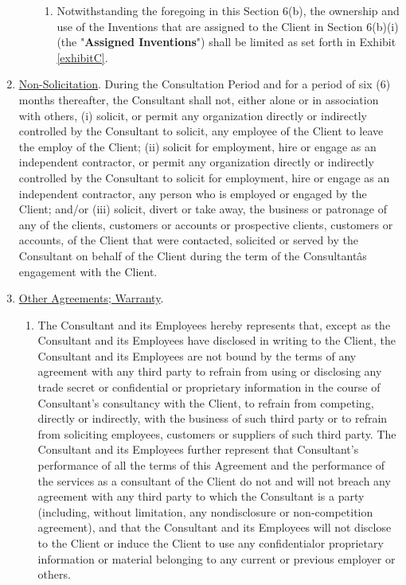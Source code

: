 \documentclass[12pt]{article}
\begin{document}
\begin{enumerate}
\begin{enumerate}
\begin{enumerate}[(1)]
            \item Notwithstanding the foregoing in this Section 6(b), the ownership and use of the Inventions that are assigned to the Client in Section 6(b)(i) (the "{\bf Assigned Inventions}") shall be limited as set forth in Exhibit \ref{exhibitC}.
        \end{enumerate}
    \end{enumerate}
    \item \underline{Non-Solicitation}.
    During the Consultation Period and for a period of six (6) months thereafter, the Consultant shall not, either alone or in association with others, (i) solicit, or permit any organization directly or indirectly controlled by the Consultant to solicit, any employee of the Client to leave the employ of the Client; (ii) solicit for employment, hire or engage as an independent contractor, or permit any organization directly or indirectly controlled by the Consultant to solicit for employment, hire or engage as an independent contractor, any person who is employed or engaged by the Client; and/or (iii) solicit, divert or take away, the business or patronage of any of the clients, customers or accounts or prospective clients, customers or accounts, of the Client that were contacted, solicited or served by the Consultant on behalf of the Client during the term of the Consultantâs engagement with the Client.
    \item \underline{Other Agreements; Warranty}.
    \begin{enumerate}
        \item The Consultant and its Employees hereby
        represents
        that, except as the
        Consultant and its Employees have
        disclosed in writing to the Client, the
        Consultant and its Employees are
        not bound by the terms of any agreement with any third party to refrain from using or disclosing any trade secret or confidential or proprietary information in the course of Consultant's consultancy with the Client, to refrain from competing, directly or indirectly, with the business of such third party or to refrain from soliciting employees, customers or suppliers of such third party.  The
        Consultant and its Employees further represent
        that Consultant's performance of all the terms of this Agreement and the performance of the services as a consultant of the Client do not and will not breach any agreement with any third party to which the Consultant is a party (including, without limitation, any nondisclosure or non-competition agreement), and that the Consultant and its Employees will not disclose to the Client or induce the Client to use any confidentialor proprietary information or material belonging to any current or previous employer or others.

\end{enumerate}
\end{enumerate}
\end{document}
